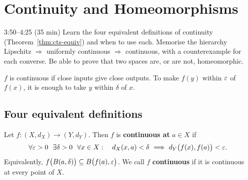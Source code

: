 \chapter{Continuity and Homeomorphisms}\label{ch:3}
\begin{studyslot}{3:50--4:25 (35 min)}
Learn the four equivalent definitions of continuity (Theorem~\ref{thm:cts-equiv}) and when to use each. Memorise the hierarchy Lipschitz $\Rightarrow$ uniformly continuous $\Rightarrow$ continuous, with a counterexample for each converse. Be able to prove that two spaces are, or are not, homeomorphic.
\end{studyslot}

\begin{intuition}
$f$ is continuous if close inputs give close outputs. To make $f(y)$ within $\varepsilon$ of $f(x)$, it is enough to take $y$ within $\delta$ of $x$.
\end{intuition}

\section{Four equivalent definitions}
\begin{definition}\label{def:cts}
Let $f\colon(X,d_X)\to(Y,d_Y)$. Then $f$ is \textbf{continuous at} $a\in X$ if
\[
  \forall\eps>0\ \ \exists\delta>0\ \ \forall x\in X:\quad d_X(x,a)<\delta\ \Longrightarrow\ d_Y\bigl(f(x),f(a)\bigr)<\eps .
\]
Equivalently, $f\bigl(B(a,\delta)\bigr)\subseteq B\bigl(f(a),\varepsilon\bigr)$. We call $f$ \textbf{continuous} if it is continuous at every point of $X$.
\end{definition}

